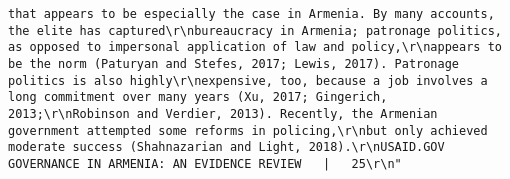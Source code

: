 \documentclass[
]{article}
\begin{document}
\begin{verbatim}
that appears to be especially the case in Armenia. By many accounts, the elite has captured\r\nbureaucracy in Armenia; patronage politics, as opposed to impersonal application of law and policy,\r\nappears to be the norm (Paturyan and Stefes, 2017; Lewis, 2017). Patronage politics is also highly\r\nexpensive, too, because a job involves a long commitment over many years (Xu, 2017; Gingerich, 2013;\r\nRobinson and Verdier, 2013). Recently, the Armenian government attempted some reforms in policing,\r\nbut only achieved moderate success (Shahnazarian and Light, 2018).\r\nUSAID.GOV                                                   GOVERNANCE IN ARMENIA: AN EVIDENCE REVIEW   |   25\r\n"                                                                                                                                                                                                                                                                                                                                                                                                                                                                                                                                                                                                                                                                                                                                                                                                                                                                                                                                                                                                                                                                 

\end{verbatim}
\end{document}
